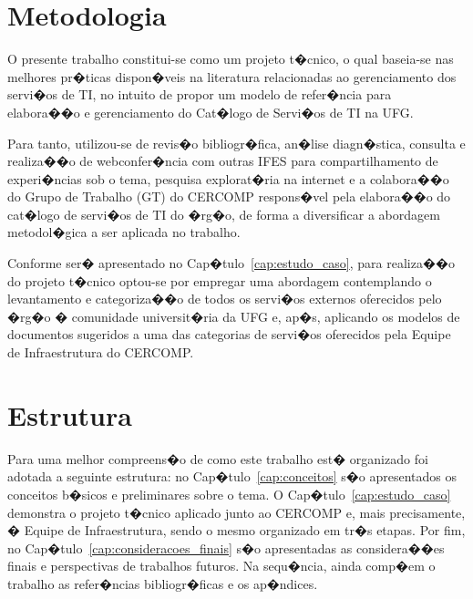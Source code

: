 \section{Metodologia}
\label{sec:metodologia}

O presente trabalho constitui-se como um projeto t�cnico, o qual baseia-se nas melhores pr�ticas dispon�veis na literatura relacionadas ao gerenciamento dos servi�os de TI, no intuito de propor um modelo de refer�ncia para elabora��o e gerenciamento do Cat�logo de Servi�os de TI na UFG.

Para tanto, utilizou-se de revis�o bibliogr�fica, an�lise diagn�stica, consulta e realiza��o de webconfer�ncia com outras IFES para compartilhamento de experi�ncias sob o tema, pesquisa explorat�ria na internet e a colabora��o do Grupo de Trabalho (GT) do CERCOMP respons�vel pela elabora��o do cat�logo de servi�os de TI do �rg�o, de forma a diversificar a abordagem metodol�gica a ser aplicada no trabalho.

Conforme ser� apresentado no Cap�tulo~\ref{cap:estudo_caso}, para realiza��o do projeto t�cnico optou-se por empregar uma abordagem contemplando o levantamento e categoriza��o de todos os servi�os externos oferecidos pelo �rg�o � comunidade universit�ria da UFG e, ap�s, aplicando os modelos de documentos sugeridos a uma das categorias de servi�os oferecidos pela Equipe de Infraestrutura do CERCOMP.

\section{Estrutura}
\label{sec:estrutura}

Para uma melhor compreens�o de como este trabalho est� organizado foi adotada a seguinte estrutura: no Cap�tulo~\ref{cap:conceitos} s�o apresentados os conceitos b�sicos e preliminares sobre o tema.
O Cap�tulo~\ref{cap:estudo_caso} demonstra o projeto t�cnico aplicado junto ao CERCOMP e, mais precisamente, � Equipe de Infraestrutura, sendo o mesmo organizado em tr�s etapas.
Por fim, no Cap�tulo~\ref{cap:consideracoes_finais} s�o apresentadas as considera��es finais e perspectivas de trabalhos futuros.
Na sequ�ncia, ainda comp�em o trabalho as refer�ncias bibliogr�ficas e os ap�ndices.
